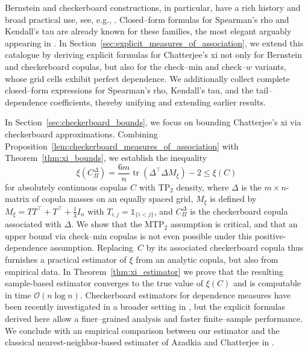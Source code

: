 \documentclass{article}
\theoremstyle{definition}
\DeclareMathOperator{\tr}{tr}  %
\def\1{\mathds{1}} %
\begin{document}
Bernstein and checkerboard constructions, in particular, have a rich history and broad practical use, see, e.g., \cite{cottin2014bernstein,kuzmenko2020checkerboard,li1997approximation,li1998strong,sancetta2004bernstein,sukeda2023minimum}.
Closed–form formulas for Spearman's rho and Kendall's tau are already known for these families, the most elegant arguably appearing in \cite{durrleman2000copulas}.
In Section~\ref{sec:explicit_measures_of_association}, we extend this catalogue by deriving explicit formulas for Chatterjee's xi not only for Bernstein and checkerboard copulas, but also for the check--min and check--$w$ variants, whose grid cells exhibit perfect dependence.
We additionally collect complete closed–form expressions for Spearman's rho, Kendall's tau, and the tail–dependence coefficients, thereby unifying and extending earlier results.

In Section~\ref{sec:checkerboard_bounds}, we focus on bounding Chatterjee's xi via checkerboard approximations.
Combining Proposition~\ref{lem:checkerboard_measures_of_association} with Theorem~\ref{thm:xi_bounds}, we establish the inequality
\begin{equation}\label{eq:xi_bound}
    \xi(C^\Delta_\Pi)
    = \frac{6m}{n}\tr\left(\Delta^{\top}\Delta M_{\xi}\right) - 2
    \le \xi(C)
\end{equation}
for absolutely continuous copulas $C$ with TP$_2$ density, where $\Delta$ is the $m\times n$-matrix of copula masses on an equally spaced grid, $M_{\xi}$ is defined by $M_{\xi} = TT^\top + T^\top + \tfrac13 I_{n}$ with $T_{i,j} = \1_{\{i<j\}}$, and $C^\Delta_\Pi$ is the checkerboard copula associated with $\Delta$.
We show that the MTP$_2$ assumption is critical, and that an upper bound via check--min copulas is not even possible under this positive-dependence assumption.
Replacing~$C$ by its associated checkerboard copula thus furnishes a practical estimator of $\xi$ from an analytic copula, but also from empirical data.
In Theorem~\ref{thm:xi_estimator} we prove that the resulting sample-based estimator converges to the true value of $\xi(C)$ and is computable in time $\mathcal{O}(n\log n)$.
Checkerboard estimators for dependence measures have been recently investigated in a broader setting in \cite[Section~4]{Ansari-Fuchs-2023}, but the explicit formulas derived here allow a finer–grained analysis and faster finite–sample performance.
We conclude with an empirical comparison between our estimator and the classical nearest-neighbor-based estimater of Azadkia and Chatterjee in \cite{chatterjee2021}.
\end{document}
